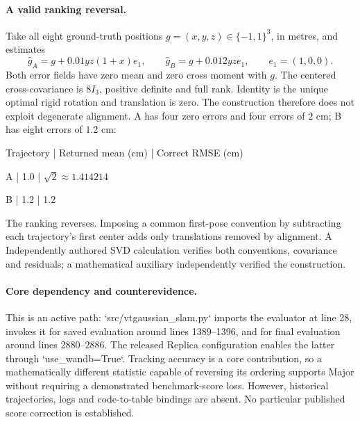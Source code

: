 \documentclass[10pt]{article}
\begin{document}
\paragraph*{A valid ranking reversal.}\mbox{}\par
Take all eight ground-truth positions \(g=(x,y,z)\in\{-1,1\}^3\), in metres, and estimates \[\hat g_A=g+0.01yz(1+x)e_1,\qquad
 \hat g_B=g+0.012yz e_1,\qquad e_1=(1,0,0).\] Both error fields have zero mean and zero cross moment with \(g\). The centered cross-covariance is \(8I_3\), positive definite and full rank. Identity is the unique optimal rigid rotation and translation is zero. The construction therefore does not exploit degenerate alignment. A has four zero errors and four errors of \(2\) cm; B has eight errors of \(1.2\) cm:\par
Trajectory | Returned mean (cm) | Correct RMSE (cm)\par
A | 1.0 | \(\sqrt2\approx1.414214\)\par
B | 1.2 | 1.2\par
The ranking reverses. Imposing a common first-pose convention by subtracting each trajectory’s first center adds only translations removed by alignment. A Independently authored SVD calculation verifies both conventions, covariance and residuals; a mathematical auxiliary independently verified the construction.\par
\paragraph*{Core dependency and counterevidence.}\mbox{}\par
This is an active path: `src/vtgaussian\_slam.py` imports the evaluator at line 28, invokes it for saved evaluation around lines 1389–1396, and for final evaluation around lines 2880–2886. The released Replica configuration enables the latter through `use\_wandb=True`. Tracking accuracy is a core contribution, so a mathematically different statistic capable of reversing its ordering supports Major without requiring a demonstrated benchmark-score loss. However, historical trajectories, logs and code-to-table bindings are absent. No particular published score correction is established.\par
\end{document}
